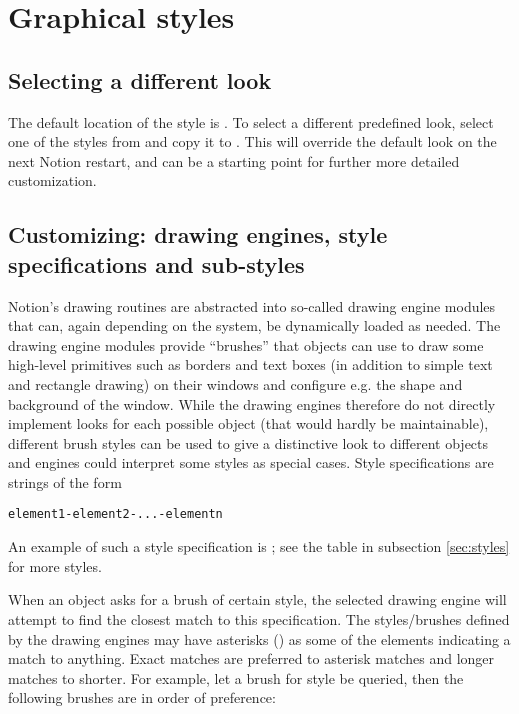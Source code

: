 
\chapter{Graphical styles}
\label{chap:gr}

\section{Selecting a different look}

The default location of the style is . To select
a different predefined look, select one of the 
styles from  and copy it to .
This will override the default look on the next Notion restart, and
can be a starting point for further more detailed customization.

\section{Customizing: drawing engines, style specifications and sub-styles}
\label{sec:engines}

Notion's drawing routines are abstracted into so-called drawing engine
modules that can, again depending on the system, be dynamically
loaded as needed. The drawing engine modules provide ``brushes''
that objects can use to draw some high-level primitives such
as borders and text boxes (in addition to simple text and rectangle
drawing) on their windows and configure e.g. the shape and 
background of the window. While the drawing engines therefore
do not directly implement looks for each possible object (that
would hardly be maintainable), different brush styles can be
used to give a distinctive look to different objects and engines
could interpret some styles as special cases. Style specifications 
are strings of the form

\begin{verbatim}
element1-element2-...-elementn
\end{verbatim}

An example of such a style specification is ;
see the table in subsection \ref{sec:styles} for more styles.

When an object asks for a brush of certain style, the selected
drawing engine will attempt to find the closest match to this
specification. The styles/brushes defined by the drawing engines 
may have asterisks (\codestr{*}) as some of the elements indicating
a match to anything. Exact matches are preferred to asterisk
matches and longer matches to shorter. For example, let a brush
for style  be queried, then the following
brushes are in order of preference:

